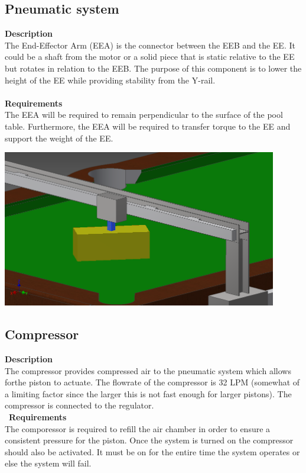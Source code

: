 \documentclass[titlepage]{article}
\begin{document}
\subsection{Pneumatic system}
\textbf{Description}\\
The End-Effector Arm (EEA) is the connector between the EEB and the EE. It could be a shaft from the motor or a solid piece that is static relative to the EE but rotates in relation to the EEB. The purpose of this component is to lower the height of the EE while providing stability from the Y-rail.\\~\\
\textbf{Requirements}\\
The EEA will be required to remain perpendicular to the surface of the pool table. Furthermore, the EEA will be required to transfer torque to the EE and support the weight of the EE.
\begin{center}
	\includegraphics[width = 0.9\textwidth]{efArm.png}	%
\label{fig:eeaFig}
\end{center}


\subsection{Compressor}
\textbf{Description}\\
The compressor provides compressed air to the pneumatic system which allows forthe piston to actuate. The flowrate of the compressor is 32 LPM (somewhat of a limiting factor since the larger this is not fast enough for larger pistons). The compressor is connected to the regulator.\\\
\textbf{Requirements}\\
The comporessor is required to refill the air chamber in order to ensure a consistent pressure for the piston. Once the system is turned on the compressor should also be activated. It must be on for the entire time the system operates or else the system will fail.
\end{document}
